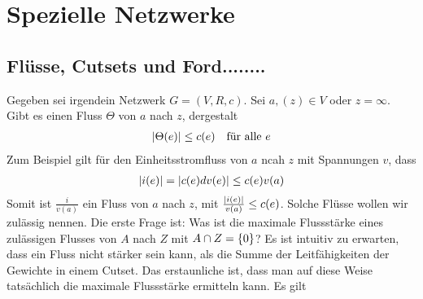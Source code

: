 \section{Spezielle Netzwerke}

\subsection{Flüsse, Cutsets und Ford........}
Gegeben sei irgendein Netzwerk $G = (V,R,c).$ Sei $a,(z) \in V$ oder $z = \infty$. Gibt es einen Fluss $\Theta$ von $a$ nach $z$, dergestalt
\begin{align}
	\lvert\Theta(e)\rvert \leq c(e) && \text{für alle } e
\end{align}
Zum Beispiel gilt für den Einheitsstromfluss von $a$ ncah $z$ mit Spannungen $v$, dass 
\begin{align}
	\lvert i(e)\rvert = \lvert c(e) dv(e)\rvert \leq c(e)v(a)
\end{align}
Somit ist $\frac{i}{v(a)}$ ein Fluss von $a$ nach $z$, mit $\frac{\lvert i(e)\rvert}{v(a)} \leq c(e)$.  Solche Flüsse wollen wir zulässig nennen.
Die erste Frage ist: Was ist die maximale Flussstärke eines zulässigen Flusses von $A$ nach $Z$ mit $A \cap Z = \{0\}$?
Es ist intuitiv zu erwarten, dass ein Fluss nicht stärker sein kann, als die Summe der Leitfähigkeiten der Gewichte in einem Cutset.  Das erstaunliche ist, dass man auf diese Weise tatsächlich die maximale Flussstärke ermitteln kann. Es gilt


